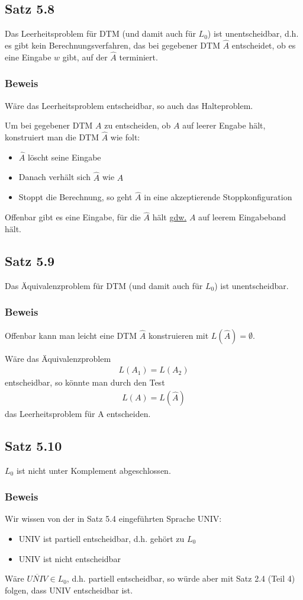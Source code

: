 \subsection{Satz 5.8}
Das Leerheitsproblem für DTM (und damit auch für $L_0$) ist unentscheidbar, d.h. es gibt kein Berechnungsverfahren, das bei gegebener DTM $\hat A$ entscheidet, ob es eine Eingabe $w$ gibt, auf der $\hat A$ terminiert.
\subsubsection{Beweis}
Wäre das Leerheitsproblem entscheidbar, so auch das Halteproblem.\par
Um bei gegebener DTM $A$ zu entscheiden, ob $A$ auf leerer Engabe hält, konstruiert man die DTM $\hat A$ wie folt:
\begin{itemize}
	\item $\hat A$ löscht seine Eingabe
	\item Danach verhält sich $\hat A$ wie $A$
	\item Stoppt die Berechnung, so geht $\hat A$ in eine akzeptierende Stoppkonfiguration
\end{itemize}
Offenbar gibt es eine Eingabe, für die $\hat A$ hält \underline{gdw.} $A$ auf leerem Eingabeband hält.
\subsection{Satz 5.9}
Das Äquivalenzproblem für DTM (und damit auch für $L_0$) ist unentscheidbar.
\subsubsection{Beweis}
Offenbar kann man leicht eine DTM $\hat A$ konstruieren mit $L(\hat A) = \emptyset $. \par 
Wäre das Äquivalenzproblem
\begin{align*}
	L(A_1) = L(A_2)
\end{align*}
entscheidbar, so könnte man durch den Test
\begin{align*}
	L(A) = L(\hat A)
\end{align*}
das Leerheitsproblem für A entscheiden.
\subsection{Satz 5.10}
$L_0$ ist nicht unter Komplement abgeschlossen.
\subsubsection{Beweis}
Wir wissen von der in Satz 5.4 eingeführten Sprache UNIV:
\begin{itemize}
	\item UNIV ist partiell entscheidbar, d.h. gehört zu $L_0$
	\item UNIV ist nicht entscheidbar
\end{itemize}
Wäre $\overline{UNIV} \in L_0$, d.h. partiell entscheidbar, so würde aber mit Satz 2.4 (Teil 4) folgen, dass UNIV entscheidbar ist. \par
